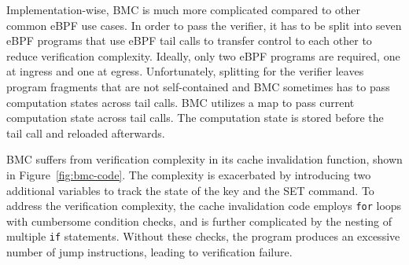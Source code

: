 Implementation-wise, BMC is much more complicated
    compared to other common eBPF use cases.
In order to pass the verifier, it has to be split into seven
    eBPF programs that use eBPF tail calls to transfer control to each other to
    reduce verification complexity.
Ideally, only two eBPF programs are required, one at ingress and one at egress.
Unfortunately, splitting for the verifier leaves program fragments that are not self-contained and
    BMC sometimes has to pass computation states across tail calls.
BMC utilizes a map to pass current computation state across tail calls.
The computation state is stored before the tail call and reloaded afterwards.

BMC suffers from verification complexity in its cache
    invalidation function, shown in Figure~\ref{fig:bmc-code}.
The complexity is exacerbated by introducing two additional variables to track
    the state of the key and the SET command.
To address the verification complexity,
    the cache invalidation code employs \texttt{for} loops with cumbersome
    condition checks, and is further complicated by the nesting of multiple
    \texttt{if} statements.
Without these checks, the program produces an excessive number of jump instructions,
    leading to verification failure.


